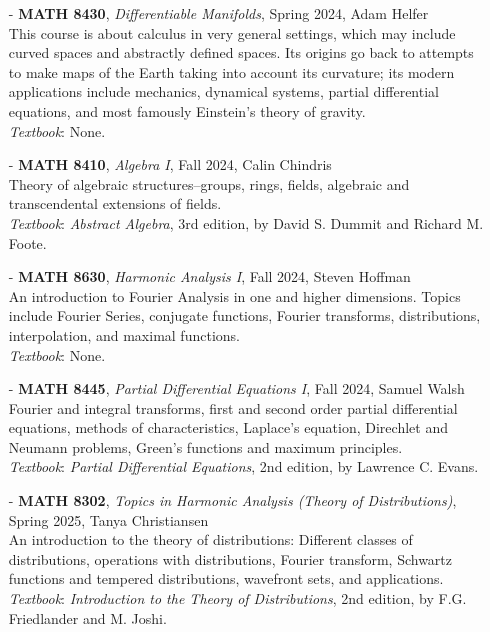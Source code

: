 \documentclass{article}
\begin{document}
\begin{enumerate}
    \item[-] \textbf{MATH 8430}, \textit{Differentiable Manifolds}, Spring 2024, Adam Helfer\\
    This course is about calculus in very general settings, which may include curved spaces and abstractly defined spaces. Its origins go back to attempts to make maps of the Earth taking into account its curvature; its modern applications include mechanics, dynamical systems, partial differential equations, and most famously Einstein's theory of gravity. \\
    \textit{Textbook}: None. 

    \item[-] \textbf{MATH 8410}, \textit{Algebra I}, Fall 2024, Calin Chindris\\
    Theory of algebraic structures--groups, rings, fields, algebraic and transcendental extensions of fields. \\
    \textit{Textbook}: \textit{Abstract Algebra}, 3rd edition, by David S. Dummit and Richard M. Foote. 
    
    \item[-] \textbf{MATH 8630}, \textit{Harmonic Analysis I}, Fall 2024, Steven Hoffman \\
    An introduction to Fourier Analysis in one and higher dimensions. Topics include Fourier Series, conjugate functions, Fourier transforms, distributions, interpolation, and maximal functions. \\
    \textit{Textbook}: None.  

    \item[-] \textbf{MATH 8445}, \textit{Partial Differential Equations I}, Fall 2024, Samuel Walsh\\
    Fourier and integral transforms, first and second order partial differential equations, methods of characteristics, Laplace's equation, Direchlet and Neumann problems, Green's functions and maximum principles. \\
    \textit{Textbook}: \textit{Partial Differential Equations}, 2nd edition, by Lawrence C. Evans. 

    \item[-] \textbf{MATH 8302}, \textit{Topics in Harmonic Analysis (Theory of Distributions)}, Spring 2025, Tanya Christiansen\\
    An introduction to the theory of distributions: Different classes of distributions, operations with distributions, Fourier transform, Schwartz functions and tempered distributions, wavefront sets, and applications. \\
    \textit{Textbook}: \textit{Introduction to the Theory of Distributions}, 2nd edition, by F.G. Friedlander and M. Joshi.
    

\end{enumerate}
\end{document}
